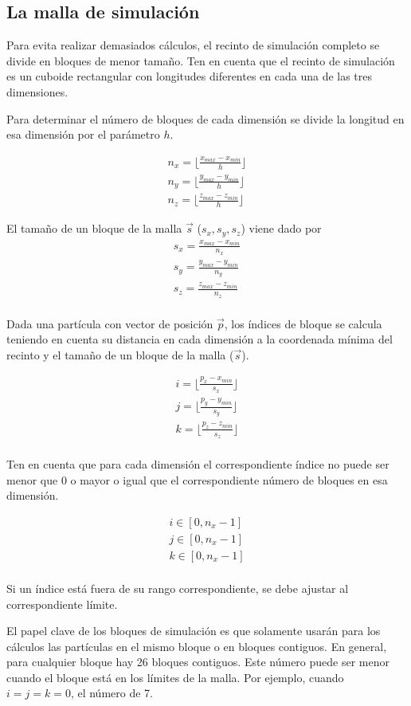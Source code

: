 \subsection{La malla de simulación}

Para evita realizar demasiados cálculos, el recinto de simulación completo se
divide en bloques de menor tamaño. Ten en cuenta que el recinto de simulación es
un cuboide rectangular con longitudes diferentes en cada una de las tres
dimensiones.

Para determinar el número de bloques de cada dimensión se divide la longitud en
esa dimensión por el parámetro $h$.

\[
\begin{split}
n_x = \lfloor \frac{x_{max}- x_{min}}{h} \rfloor\\
n_y = \lfloor \frac{y_{max}- y_{min}}{h} \rfloor\\
n_z = \lfloor \frac{z_{max}- z_{min}}{h} \rfloor
\end{split}
\]

El tamaño de un bloque de la malla $\vec{s}$ ($s_x, s_y, s_z$) viene dado por
\[
\begin{split}
s_x = \frac{x_{max} - x_{min}}{n_x}\\
s_y = \frac{y_{max} - y_{min}}{n_y}\\
s_z = \frac{z_{max} - z_{min}}{n_z}\\
\end{split}
\] 

Dada una partícula con vector de posición $\vec{p}$, los índices de bloque se
calcula teniendo en cuenta su distancia en cada dimensión a la coordenada mínima
del recinto y el tamaño de un bloque de la malla ($\vec{s}$).

\[
\begin{split}
i = \lfloor \frac{p_x - x_{min}}{s_x} \rfloor\\
j = \lfloor \frac{p_y - y_{min}}{s_y} \rfloor\\
k = \lfloor \frac{p_z - z_{min}}{s_z} \rfloor\\
\end{split}
\]

Ten en cuenta que para cada dimensión el correspondiente índice no puede ser
menor que $0$ o mayor o igual que el correspondiente número de bloques en esa
dimensión.

\[
\begin{split}
i \in [0, n_x-1]\\
j \in [0, n_x-1]\\
k \in [0, n_x-1]\\
\end{split}
\]

Si un índice está fuera de su rango correspondiente, se debe ajustar al
correspondiente límite.

El papel clave de los bloques de simulación es que solamente usarán para los
cálculos las partículas en el mismo bloque o en bloques contiguos. En general,
para cualquier bloque hay 26 bloques contiguos. Este número puede ser menor
cuando el bloque está en los límites de la malla. Por ejemplo, cuando $i=j=k=0$,
el número de 7.
